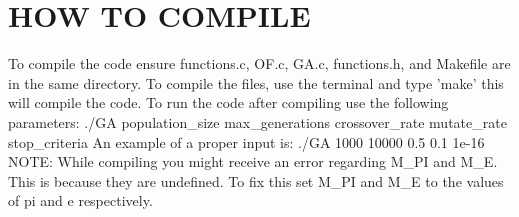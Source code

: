 \documentclass[12pt]{article}
\begin{document}
    \newpage
	\section{HOW TO COMPILE}
 To compile the code ensure functions.c, OF.c, GA.c, functions.h, and Makefile are in the same directory.\newline\newline
 To compile the files, use the terminal and type 'make' this will compile the code. \newline\newline
 To run the code after compiling use the following parameters:\newline
 ./GA  population\_size  max\_generations  crossover\_rate  mutate\_rate  stop\_criteria\newline\newline
 An example of a proper input is: ./GA 1000 10000 0.5 0.1 1e-16\newline\newline\newline
 NOTE: While compiling you might receive an error regarding M\_PI and M\_E. This is because they are undefined. To fix this set M\_PI and M\_E to the values of pi and e respectively. 	
\end{document}
